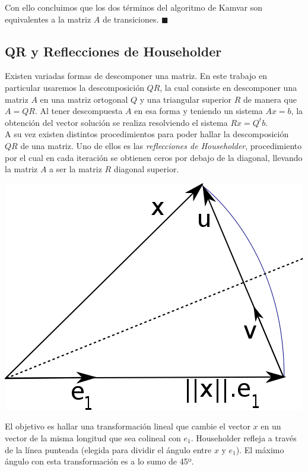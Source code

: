 Con ello concluimos que los dos términos del algoritmo de Kamvar son equivalentes
a la matriz $A$ de transiciones. $ \blacksquare $

\subsection{QR y Reflecciones de Householder}

Existen variadas formas de descomponer una matriz. En este trabajo en particular usaremos la descomposición $QR$,
la cual consiste en descomponer una matriz $A$ en una matriz ortogonal $Q$ y una triangular superior $R$
de manera que $A = QR$. Al tener descompuesta $A$ en esa forma y teniendo un sistema $Ax= b$,
la obtención del vector solución se realiza resolviendo el sistema $Rx = Q^{t}b$.\\

A su vez existen distintos procedimientos para poder hallar la descomposición $QR$ de una matriz.
Uno de ellos es las \textit{reflecciones de Householder}, procedimiento por el cual en cada iteración se obtienen ceros por debajo de la diagonal, llevando la matriz $A$ a ser la matriz $R$ diagonal superior.\\

\begin{center}
  \centering
  \includegraphics[scale=0.5]{./archivos/graficos/householder.png}
\end{center}

El objetivo es hallar una transformación lineal que cambie el vector $x$ en un vector de la misma longitud que sea colineal con $e_1$. Householder refleja a través de la línea punteada (elegida para dividir el ángulo entre $x$ y $e_1$). El máximo ángulo con esta transformación es a lo sumo de 45º.\\

